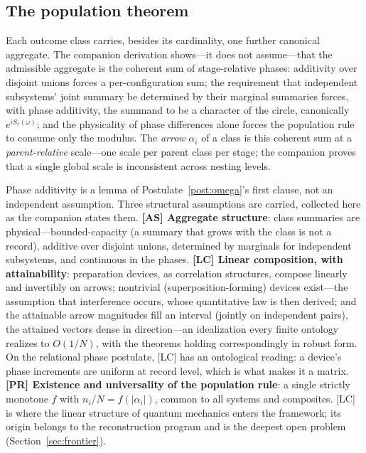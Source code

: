 \documentclass[11pt]{article}
\theoremstyle{definition}
\theoremstyle{remark}
\begin{document}
\subsection{The population theorem}\label{sec:popthm}
Each outcome class carries, besides its cardinality, one further canonical aggregate. The companion derivation \cite{TillittBorn} shows---it does not assume---that the admissible aggregate is the coherent sum of stage-relative phases: additivity over disjoint unions forces a per-configuration sum; the requirement that independent subsystems' joint summary be determined by their marginal summaries forces, with phase additivity, the summand to be a character of the circle, canonically $e^{iS_r(\omega)}$; and the physicality of phase differences alone forces the population rule to consume only the modulus. The \emph{arrow} $\alpha_i$ of a class is this coherent sum at a \emph{parent-relative} scale---one scale per parent class per stage; the companion proves that a single global scale is inconsistent across nesting levels.

Phase additivity is a lemma of Postulate~\ref{post:omega}'s first clause, not an independent assumption. Three structural assumptions are carried, collected here as the companion states them. \textbf{[AS] Aggregate structure}: class summaries are physical---bounded-capacity (a summary that grows with the class is not a record), additive over disjoint unions, determined by marginals for independent subsystems, and continuous in the phases. \textbf{[LC] Linear composition, with attainability}: preparation devices, as correlation structures, compose linearly and invertibly on arrows; nontrivial (superposition-forming) devices exist---the assumption that interference occurs, whose quantitative law is then derived; and the attainable arrow magnitudes fill an interval (jointly on independent pairs), the attained vectors dense in direction---an idealization every finite ontology realizes to $O(1/N)$, with the theorems holding correspondingly in robust form. On the relational phase postulate, [LC] has an ontological reading: a device's phase increments are uniform at record level, which is what makes it a matrix. \textbf{[PR] Existence and universality of the population rule}: a single strictly monotone $f$ with $n_i/N = f(|\alpha_i|)$, common to all systems and composites. [LC] is where the linear structure of quantum mechanics enters the framework; its origin belongs to the reconstruction program \cite{Hardy2001,CDP2011,MasanesMuller2011} and is the deepest open problem (Section~\ref{sec:frontier}).
\end{document}
